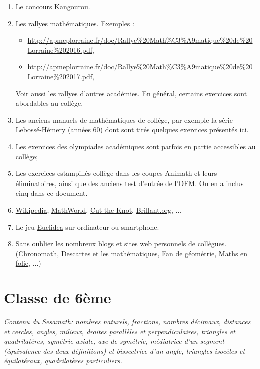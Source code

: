 \begin{enumerate}
\item Le concours Kangourou.
\item Les rallyes mathématiques. Exemples : 
\begin{itemize}
\item \url{http://apmeplorraine.fr/doc/Rallye%20Math%C3%A9matique%20de%20Lorraine%202016.pdf}, 
\item \url{http://apmeplorraine.fr/doc/Rallye%20Math%C3%A9matique%20de%20Lorraine%202017.pdf},
\end{itemize}
Voir aussi les rallyes d'autres académies. En général, certains exercices sont abordables au collège.
\item Les anciens manuels de mathématiques de collège, par exemple la série Lebossé-Hémery (années 60) dont sont tirés quelques exercices présentés ici. 
\item Les exercices des olympiades académiques sont parfois en partie accessibles au collège;
\item Les exercices estampillés \og collège \fg{} dans les coupes Animath et leurs éliminatoires, ainsi que des anciens test d'entrée de l'OFM. On en a inclus cinq dans ce document.
\item \href{http://fr.wikipedia.org}{Wikipedia}, \href{http://mathworld.wolfram.com/}{MathWorld}, \href{https://www.cut-the-knot.org/}{Cut the Knot}, \href{https://www.brilliant.org}{Brillant.org}, ...
\item Le jeu \href{https://www.euclidea.xyz}{Euclidea} sur ordinateur ou smartphone.
\item Sans oublier les nombreux blogs et sites web personnels de collègues. (\href{http://serge.mehl.free.fr/base/index_concr1.html}{Chronomath}, \href{http://debart.pagesperso-orange.fr/}{Descartes et les mathématiques}, \href{http://fandegeometrie.blogspot.fr/}{Fan de géométrie}, \href{http://mathafou.free.fr/}{Maths en folie}, ...) 
\end{enumerate}


\section{Classe de 6ème}

\emph{Contenu du Sesamath: nombres naturels, fractions, nombres décimaux, distances et cercles, angles, milieux, droites parallèles et perpendiculaires, triangles et quadrilatères, symétrie axiale, axe de symétrie, médiatrice d'un segment (équivalence des deux définitions) et bissectrice d'un angle, triangles isocèles et équilatéraux, quadrilatères particuliers.}




